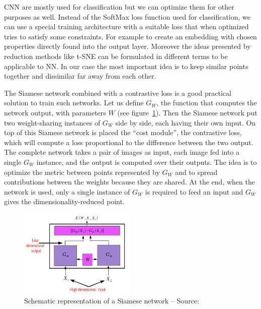 \documentclass[a4paper,12pt]{report}
\begin{document}
CNN are mostly used for classification but we can optimize them for other purposes as well.
Instead of the SoftMax loss function used for classification, we can use a special training architecture with a suitable loss that when optimized tries to satisfy some constraints.
For example to create an embedding with chosen properties directly found into the output layer.
Moreover the ideas presented by reduction methods like t-SNE can be formulated in different terms to be applicable to NN.
In our case the most important idea is to keep similar points together and dissimilar far away from each other.

The Siamese network combined with a contrastive loss is a good practical solution to train such networks\cite{bromley1993signature}\cite{chopra2005learning}.
Let us define $G_W$, the function that computes the network output, with parameters $W$ (see figure~\ref{fig:siamese_network}).
Then the Siamese network put two weight-sharing instances of $G_W$ side by side, each having their own input.
On top of this Siamese network is placed the ``cost module'', the contrastive loss, which will compute a loss proportional to the difference between the two output.
The complete network takes a pair of images as input, each image fed into a single $G_W$ instance, and the output is computed over their outputs.
The idea is to optimize the metric between points represented by $G_W$ and to spread contributions between the weights because they are shared.
At the end, when the network is used, only a single instance of $G_W$ is required to feed an input and $G_W$ gives the dimensionality-reduced point.

\begin{figure}[t]
    \begin{center}
        \includegraphics[width=0.5\textwidth]{thesis_figures/siamese_network.jpg}
    \end{center}
    \caption{Schematic representation of a Siamese network -- Source:~\cite{bromley1993signature}}
    \label{fig:siamese_network}
\end{figure}
\end{document}
